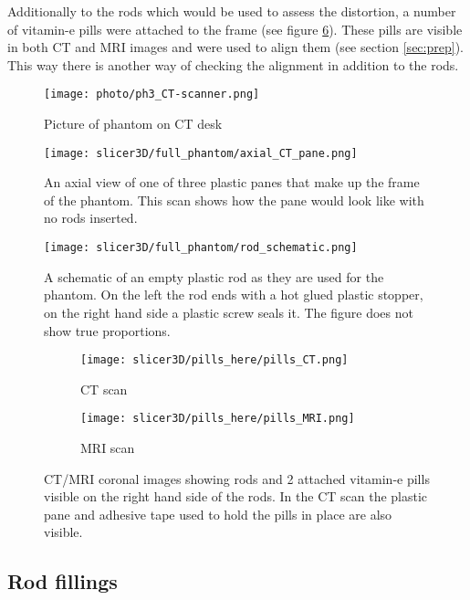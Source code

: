 Additionally to the rods which would be used to assess the distortion, a number of vitamin-e pills were attached to the frame (see figure \ref{fig:pills}).
These pills are visible in both CT and MRI images and were used to align them (see section \ref{sec:prep}).
This way there is another way of checking the alignment in addition to the rods.


\begin{figure}[!bp]
\centering
\texttt{[image: photo/ph3\_CT-scanner.png]}
\caption{Picture of phantom on CT desk}
\label{fig:photo_ph3}
\end{figure}

\begin{figure}[!tbp]
\centering
\texttt{[image: slicer3D/full\_phantom/axial\_CT\_pane.png]}
\caption{An axial view of one of three plastic panes that make up the frame of the phantom. This scan shows how the pane would look like with no rods inserted.}
\label{fig:axial_CT_pane}
\end{figure}

\begin{figure}[!tbp]
\centering
\texttt{[image: slicer3D/full\_phantom/rod\_schematic.png]}
\caption{A schematic of an empty plastic rod as they are used for the phantom. On the left the rod ends with a hot glued plastic stopper, on the right hand side a plastic screw seals it. The figure does not show true proportions.}
\label{fig:rod_schematic}
\end{figure}


\begin{figure}[!thb]
\centering
  \begin{subfigure}[b]{0.45\textwidth}
  \centering
    \texttt{[image: slicer3D/pills\_here/pills\_CT.png]}
    \caption{CT scan}
    \label{fig:CT_x1}
  \end{subfigure}
  \begin{subfigure}[b]{0.45\textwidth}
  \centering
      \texttt{[image: slicer3D/pills\_here/pills\_MRI.png]}
    \caption{MRI scan}
    \label{fig:MRI_x100}
  \end{subfigure}
  \caption{CT/MRI coronal images showing rods and 2 attached vitamin-e pills visible on the right hand side of the rods. In the CT scan the plastic pane and adhesive tape used to hold the pills in place are also visible.}
  \label{fig:pills}
\end{figure}

\clearpage

\subsection{Rod fillings}

